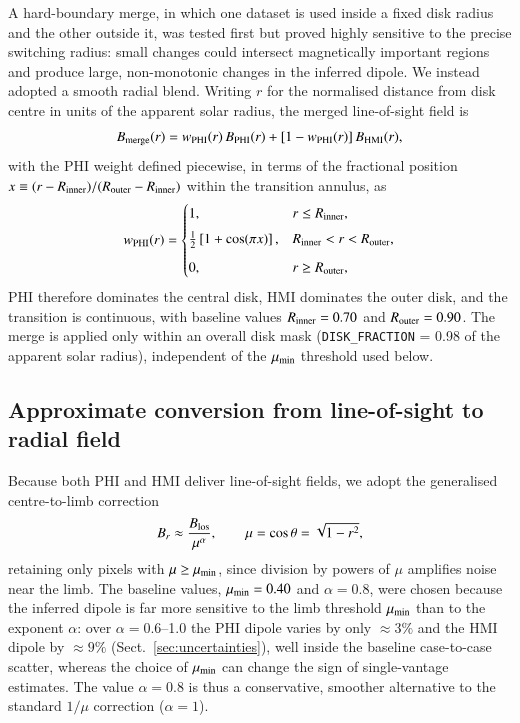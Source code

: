 \documentclass{aa}
\begin{document}
A hard-boundary merge, in which one dataset is used inside a fixed disk radius and the other outside it, was tested first but proved highly sensitive to the precise switching radius: small changes could intersect magnetically important regions and produce large, non-monotonic changes in the inferred dipole. We instead adopted a smooth radial blend. Writing $r$ for the normalised distance from disk centre in units of the apparent solar radius, the merged line-of-sight field is
\begin{equation}
    B_{\rm merge}(r) = w_{\rm PHI}(r)\, B_{\rm PHI}(r) + \left[1 - w_{\rm PHI}(r)\right] B_{\rm HMI}(r),
    \label{eq:blend}
\end{equation}
with the PHI weight defined piecewise, in terms of the fractional position $x \equiv (r - R_{\rm inner})/(R_{\rm outer} - R_{\rm inner})$ within the transition annulus, as
\begin{equation}
    w_{\rm PHI}(r) =
    \begin{cases}
        1, & r \le R_{\rm inner}, \\[4pt]
        \frac{1}{2}\left[1 + \cos(\pi x)\right], & R_{\rm inner} < r < R_{\rm outer}, \\[6pt]
        0, & r \ge R_{\rm outer},
    \end{cases}
    \label{eq:weight}
\end{equation}
PHI therefore dominates the central disk, HMI dominates the outer disk, and the transition is continuous, with baseline values $R_{\rm inner} = 0.70$ and $R_{\rm outer} = 0.90$. The merge is applied only within an overall disk mask (\texttt{DISK\_FRACTION} = 0.98 of the apparent solar radius), independent of the $\mu_{\rm min}$ threshold used below.

\subsection{Approximate conversion from line-of-sight to radial field}
\label{sec:methods-radial}

Because both PHI and HMI deliver line-of-sight fields, we adopt the generalised centre-to-limb correction
\begin{equation}
    B_r \approx \frac{B_{\rm los}}{\mu^{\alpha}}, \qquad \mu = \cos\theta = \sqrt{1 - r^2},
    \label{eq:br}
\end{equation}
retaining only pixels with $\mu \ge \mu_{\rm min}$, since division by powers of $\mu$ amplifies noise near the limb. The baseline values, $\mu_{\rm min} = 0.40$ and $\alpha = 0.8$, were chosen because the inferred dipole is far more sensitive to the limb threshold $\mu_{\rm min}$ than to the exponent $\alpha$: over $\alpha = 0.6$--1.0 the PHI dipole varies by only $\approx 3\%$ and the HMI dipole by $\approx 9\%$ (Sect.~\ref{sec:uncertainties}), well inside the baseline case-to-case scatter, whereas the choice of $\mu_{\rm min}$ can change the sign of single-vantage estimates. The value $\alpha = 0.8$ is thus a conservative, smoother alternative to the standard $1/\mu$ correction ($\alpha = 1$).
\end{document}

